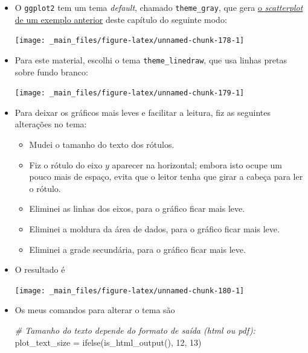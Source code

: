 \documentclass[
  11pt]{report}
\newenvironment{Shaded}{\begin{snugshade}}{\end{snugshade}}
\newcommand{\CommentTok}[1]{\textcolor[rgb]{0.56,0.35,0.01}{\textit{#1}}}
\newcommand{\DecValTok}[1]{\textcolor[rgb]{0.00,0.00,0.81}{#1}}
\newcommand{\FunctionTok}[1]{\textcolor[rgb]{0.00,0.00,0.00}{#1}}
\newcommand{\NormalTok}[1]{#1}
\newcommand{\OtherTok}[1]{\textcolor[rgb]{0.56,0.35,0.01}{#1}}
\renewenvironment{Shaded}{
    \begin{mdframed}[%
      roundcorner=2pt,%
      innerleftmargin=5pt,%
      innerrightmargin=5pt,%
      topline=true,%
      leftline=true,%
      rightline=true,%
      bottomline=true,%
      linewidth=0.5pt,%
      linecolor=black!20,%
      backgroundcolor=black!2,%
      skipabove=2ex,%
      skipbelow=2.5ex%
    ]%
  }
  {
    \end{mdframed}
  }
\begin{document}
\begin{itemize}
\item
  O \texttt{ggplot2} tem um tema \emph{default}, chamado \texttt{theme\_gray}, que gera \protect\hyperlink{grafico4}{o \emph{scatterplot} de um exemplo anterior} deste capítulo do seguinte modo:

  \begin{center}\texttt{[image: \_main\_files/figure-latex/unnamed-chunk-178-1]} \end{center}
\item
  Para este material, escolhi o tema \texttt{theme\_linedraw}, que usa linhas pretas sobre fundo branco:

  \begin{center}\texttt{[image: \_main\_files/figure-latex/unnamed-chunk-179-1]} \end{center}
\item
  Para deixar os gráficos mais leves e facilitar a leitura, fiz as seguintes alterações no tema:

  \begin{itemize}
  \item
    Mudei o tamanho do texto dos rótulos.
  \item
    Fiz o rótulo do eixo $y$ aparecer na horizontal; embora isto ocupe um pouco mais de espaço, evita que o leitor tenha que girar a cabeça para ler o rótulo.
  \item
    Eliminei as linhas dos eixos, para o gráfico ficar mais leve.
  \item
    Eliminei a moldura da área de dados, para o gráfico ficar mais leve.
  \item
    Eliminei a grade secundária, para o gráfico ficar mais leve.
  \end{itemize}
\item
  O resultado é

  \begin{center}\texttt{[image: \_main\_files/figure-latex/unnamed-chunk-180-1]} \end{center}
\item
  Os meus comandos para alterar o tema são

\begin{Shaded}
\begin{Highlighting}[]
\CommentTok{\# Tamanho do texto depende do formato de saída (html ou pdf):}
\NormalTok{plot\_text\_size }\OtherTok{=} \FunctionTok{ifelse}\NormalTok{(}\FunctionTok{is\_html\_output}\NormalTok{(), }\DecValTok{12}\NormalTok{, }\DecValTok{13}\NormalTok{)}


\end{Highlighting}
\end{Shaded}
\end{itemize}
\end{document}
